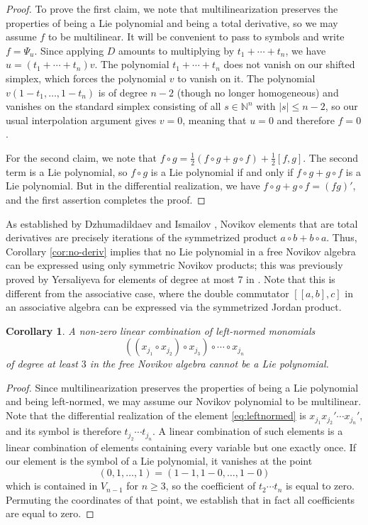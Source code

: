 \documentclass[11pt,reqno]{amsart}
\theoremstyle{plain}
\newtheorem{corollary}[theorem]{Corollary}
\theoremstyle{definition}
\theoremstyle{remark}
\begin{document}
\begin{proof}
To prove the first claim, we note that multilinearization preserves the properties of being a Lie polynomial and being a total derivative, so we may assume $f$ to be multilinear. It will be convenient to pass to symbols and write $f=\Psi_u$. Since applying $D$ amounts to multiplying by $t_1+\cdots+t_n$, we have $u=(t_1+\cdots+t_n)v$. The polynomial $t_1+\cdots+t_n$ does not vanish on our shifted simplex, which forces the polynomial $v$ to vanish on it. The polynomial $v(1-t_1,\ldots,1-t_n)$ is of degree $n-2$ (though no longer homogeneous) and vanishes on the standard simplex consisting of all $s\in\mathbb{N}^n$ with $|s|\le n-2$, so our usual interpolation argument gives $v=0$, meaning that $u=0$ and therefore $f=0$.

For the second claim, we note that $f\circ g=\frac12(f\circ g+g\circ f)+\frac12[f,g]$. The second term is a Lie polynomial, so $f\circ g$ is a Lie polynomial if and only if $f\circ g+g\circ f$ is a Lie polynomial. But in the differential realization, we have $f\circ g+g\circ f=(fg)'$, and the first assertion completes the proof.
\end{proof}

As established by Dzhumadildaev and Ismailov \cite[Th.~3.2]{DI2026}, Novikov elements that are total derivatives are precisely iterations of the symmetrized product $a\circ b+b\circ a$. Thus, Corollary \ref{cor:no-deriv} implies that no Lie polynomial in a free Novikov algebra can be expressed using only symmetric Novikov products; this was previously proved by Yersaliyeva for elements of degree at most $7$ in \cite{Yersaliyeva2026}. Note that this is different from the associative case, where the double commutator $[[a,b],c]$ in an associative algebra can be expressed via the symmetrized Jordan product. 

\begin{corollary}
A non-zero linear combination of left-normed monomials 
\begin{equation}\label{eq:leftnormed}
((x_{j_1}\circ x_{j_2})\circ x_{j_3})\circ\cdots\circ x_{j_n}
\end{equation}
of degree at least $3$ in the free Novikov algebra cannot be a Lie polynomial. 
\end{corollary}

\begin{proof}
Since multilinearization preserves the properties of being a Lie polynomial and being left-normed, we may assume our Novikov polynomial to be multilinear. 
Note that the differential realization of the element \eqref{eq:leftnormed}
is $x_{j_1}x_{j_2}'\cdots x_{j_n}'$, and its symbol is therefore $t_{j_2}\cdots t_{j_n}$. A linear combination of such elements is a linear combination of elements containing every variable but one exactly once. If our element is the symbol of a Lie polynomial, it vanishes at the point 
 \[
 (0,1,\ldots,1)=(1-1,1-0,\ldots,1-0)  
 \]
which is contained in $V_{n-1}$ for $n\ge 3$, so the coefficient of $t_2\cdots t_n$ is equal to zero. Permuting the coordinates of that point, we establish that in fact all coefficients are equal to zero. 
\end{proof}
\end{document}
